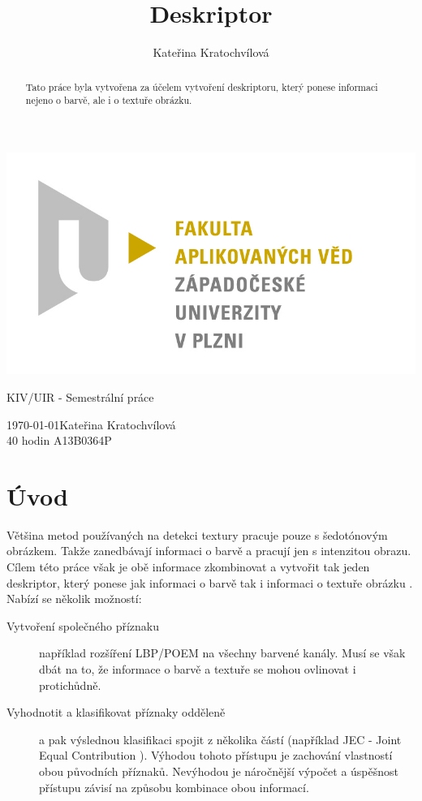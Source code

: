 \documentclass{report}
\title{Deskriptor}
\author{Kateřina Kratochvílová}
\begin{document}
 
\shorthandoff{-}
\begin{titlepage}
	\begin{flushleft} 
		{\includegraphics[width=.5\textwidth]{./img/fav_logo.jpg}\\[3cm]}
	\end{flushleft}
	\vspace{1.5cm}
	\begin{center}
		{\Huge KIV/UIR - Semestrální práce}
	\end{center}
	\vfill
	{\normalsize 
		\today \hfill Kateřina Kratochvílová \\
		40 hodin \hfill A13B0364P \\
	}

\end{titlepage}


\tableofcontents
\thispagestyle{empty} %

\begin{abstract}
Tato práce byla vytvořena za účelem vytvoření deskriptoru, který ponese informaci nejeno o barvě, ale i o textuře obrázku. 
\end{abstract}

\chapter{Úvod}
Většina metod používaných na detekci textury pracuje pouze s šedotónovým obrázkem. Takže zanedbávají informaci o barvě a pracují jen s intenzitou obrazu. Cílem této práce však je obě informace zkombinovat a vytvořit tak jeden deskriptor, který ponese jak informaci o barvě tak i informaci o textuře obrázku \cite{DiplomovaBrno}. Nabízí se několik možností: 

\begin{description}
\item[Vytvoření společného příznaku] 
například rozšíření LBP/POEM na všechny barvené kanály. Musí se však dbát na to, že informace o barvě a textuře se mohou ovlinovat i protichůdně. 

\item[Vyhodnotit a klasifikovat příznaky odděleně] 
a pak výslednou klasifikaci spojit z několika částí (například JEC - Joint Equal Contribution \cite{JEC} ). Výhodou tohoto přístupu je zachování vlastností obou původních příznaků. Nevýhodou je náročnější výpočet a úspěšnost přístupu závisí na způsobu kombinace obou informací.
\end{description} 
\end{document}
